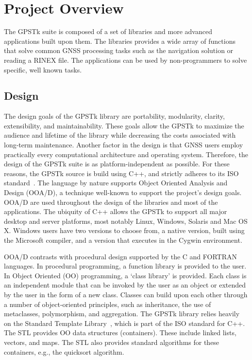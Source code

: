 \section*{Project Overview}

The GPSTk suite is composed of a set of libraries and more advanced
applications built upon them. The libraries provides a wide array of
functions that solve common GNSS processing tasks such as the
navigation solution or reading a RINEX file.  The applications can be
used by non-programmers to solve specific, well known tasks.

\subsection*{Design}

The design goals of the GPSTk library are portability, modularity,
clarity, extensibility, and maintainability. These goals allow the
GPSTk to maximize the audience and lifetime of the library while
decreasing the costs associated with long-term maintenance. Another
factor in the design is that GNSS users employ practically every
computational architecture and operating system. Therefore, the design
of the GPSTk suite is as platform-independent as possible. For these
reasons, the GPSTk source is build using C++, and strictly adheres to
its ISO standard~\cite{iso-14882-2003}. The language by nature
supports Object Oriented Analysis and Design (OOA/D), a technique
well-known to support the project's design goals. OOA/D are used
throughout the design of the libraries and most of the applications.
The ubiquity of C++ allows the GPSTk to support all major desktop and
server platforms, most notably Linux, Windows, Solaris and Mac OS X.
Windows users have two versions to choose from, a native version,
built using the Microsoft compiler, and a version that executes in the
Cygwin environment.

OOA/D contrasts with procedural design supported by the C and FORTRAN
languages. In procedural programming, a function library is provided
to the user. In Object Oriented (OO) programming, a ‘class library’
is provided. Each class is an independent module that can be invoked
by the user as an object or extended by the user in the form of a new
class. Classes can build upon each other through a number of
object-oriented principles, such as inheritance, the use of
metaclasses, polymorphism, and aggregation. The GPSTk library relies
heavily on the Standard Template Library~\cite{stlwebsite}, 
which is part of the ISO standard for
C++. The STL provides OO data structures (containers). These include
linked lists, vectors, and maps. The STL also provides standard
algorithms for these containers, e.g., the quicksort
algorithm.

